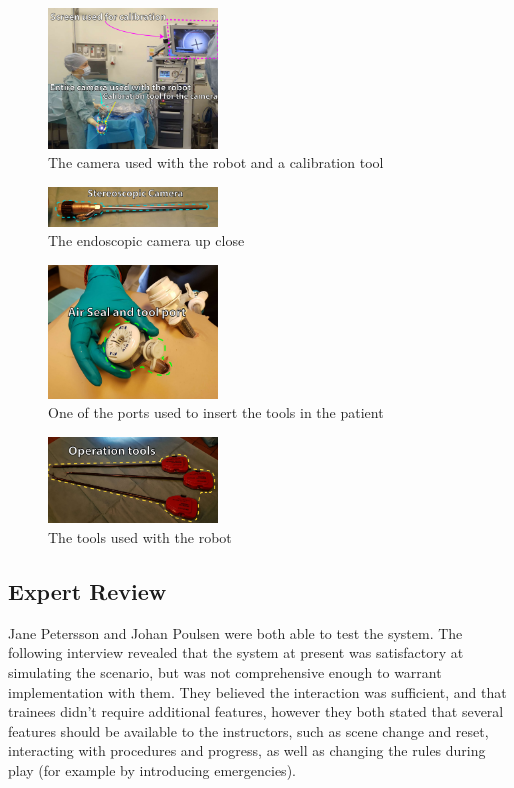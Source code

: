 \documentclass[paper=a4, fontsize=11pt]{scrartcl} %
\numberwithin{equation}{section} %
\numberwithin{figure}{section} %
\numberwithin{table}{section} %
\begin{document}
\begin{figure}[hbpt]
	\centering
	\includegraphics[width=0.4\textwidth]{camera.pdf}
	\caption{The camera used with the robot and a calibration tool}
	\label{fig:camera}
\end{figure}

\begin{figure}[hbpt]
	\centering
	\includegraphics[width=0.4\textwidth]{camera_close}
	\caption{The endoscopic camera up close}
	\label{fig:cam_close}
\end{figure}

\begin{figure}[hbpt]
	\centering
	\includegraphics[width=0.4\textwidth]{port}
	\caption{One of the ports used to insert the tools in the patient}
	\label{fig:port}
\end{figure}

\begin{figure}[hbpt]
	\centering
	\includegraphics[width=0.4\textwidth]{tools}
	\caption{The tools used with the robot}
	\label{fig:tools}
\end{figure}


\subsection{Expert Review}
Jane Petersson and Johan Poulsen were both able to test the system. The following interview revealed that the system at present was satisfactory at simulating the scenario, but was not comprehensive enough to warrant implementation with them. They believed the interaction was sufficient, and that trainees didn’t require additional features, however they both stated that several features should be available to the instructors, such as scene change and reset, interacting with procedures and progress, as well as changing the rules during play (for example by introducing emergencies).
\end{document}
